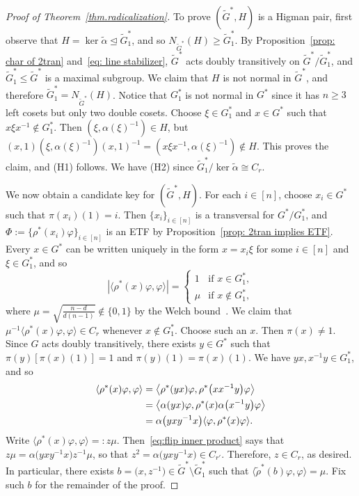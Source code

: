 \documentclass[11pt]{article}
\theoremstyle{definition}
\numberwithin{equation}{section}
\begin{document}
\begin{proof}[Proof of Theorem~\ref{thm.radicalization}]
To prove $(\widetilde{G}^*, H)$ is a Higman pair, first observe that $H = \ker \widetilde{\alpha} \trianglelefteq \widetilde{G}_1^*$, and so $N_{\widetilde{G}^*}(H) \geq \widetilde{G}_1^*$.
By Proposition~\ref{prop: char of 2tran} and~\eqref{eq: line stabilizer}, $\widetilde{G}^*$ acts doubly transitively on $\widetilde{G}^*/\widetilde{G}_1^*$, and $\widetilde{G}_1^*\leq \widetilde{G}^*$ is a maximal subgroup.
We claim that $H$ is not normal in $\widetilde{G}^*$, and therefore $\widetilde{G}_1^* = N_{\widetilde{G}^*}(H)$.
Notice that $G_1^*$ is not normal in $G^*$ since it has $n\geq 3$ left cosets but only two double cosets.
Choose $\xi \in G_1^*$ and $x \in G^*$ such that $x\xi x^{-1} \notin G_1^*$.
Then $(\xi,\alpha(\xi)^{-1}) \in H$, but $(x,1)(\xi,\alpha(\xi)^{-1})(x,1)^{-1} = (x\xi x^{-1},\alpha(\xi)^{-1}) \notin H$.
This proves the claim, and (H1) follows.
We have (H2) since $\widetilde{G}_1^*/\ker \widetilde{\alpha} \cong C_r$.

We now obtain a candidate key for $(\widetilde{G}^*, H)$.
For each $i \in [n]$, choose $x_i \in G^*$ such that $\pi(x_i)(1) = i$.
Then $\{ x_i \}_{i \in [n]}$ is a transversal for $G^* / G_1^*$, and $\Phi := \{ \rho^*(x_i) \varphi \}_{i\in [n]}$ is an ETF by Proposition~\ref{prop: 2tran implies ETF}.
Every $x \in G^*$ can be written uniquely in the form $x = x_i \xi$ for some $i \in [n]$ and $\xi \in G_1^*$, and so
\begin{equation}
\label{eq: phi levels}
| \langle \rho^*(x) \varphi, \varphi \rangle | = \begin{cases}
1 & \text{if }x \in G_1^*, \\
\mu & \text{if }x \notin G_1^*,
\end{cases}
\end{equation}
where $\mu = \sqrt{\frac{n-d}{d(n-1)}} \notin \{0,1\}$ by the Welch bound~\cite{Welch:74}.
We claim that $\mu^{-1} \langle \rho^*(x) \varphi, \varphi \rangle \in C_r$ whenever $x \notin G_1^*$.
Choose such an $x$.
Then $\pi(x) \neq 1$.
Since $G$ acts doubly transitively, there exists $y \in G^*$ such that $\pi(y)[\pi(x)(1)] = 1$ and $\pi(y)(1) = \pi(x)(1)$.
We have $yx,x^{-1}y \in G_1^*$, and so
\begin{align}
\label{eq:flip inner product}
\langle \rho^*(x) \varphi, \varphi \rangle 
&= \bigl\langle \rho^*(yx) \varphi, \rho^*\bigl(xx^{-1}y\bigr) \varphi \bigr\rangle \\ \notag
&= \bigl\langle \alpha(yx) \varphi, \rho^*(x) \alpha\bigl(x^{-1} y \bigr) \varphi \bigr\rangle \\ \notag
&= \alpha\bigl(yxy^{-1}x\bigr) \langle \varphi, \rho^*(x) \varphi \rangle.
\end{align}
Write $\langle \rho^*(x) \varphi, \varphi \rangle =: z \mu$.
Then~\eqref{eq:flip inner product} says that $z \mu = \alpha\bigl(yxy^{-1}x\bigr) z^{-1} \mu$, so that $z^2 = \alpha\bigl(yxy^{-1}x\bigr) \in C_{r'}$.
Therefore, $z \in C_r$, as desired.
In particular, there exists $b = \bigl(x,z^{-1}\bigr) \in \widetilde{G}^* \setminus \widetilde{G}_1^*$ such that $\langle \tilde{\rho}^*(b) \varphi, \varphi \rangle = \mu$.
Fix such $b$ for the remainder of the proof.


\end{proof}
\end{document}
